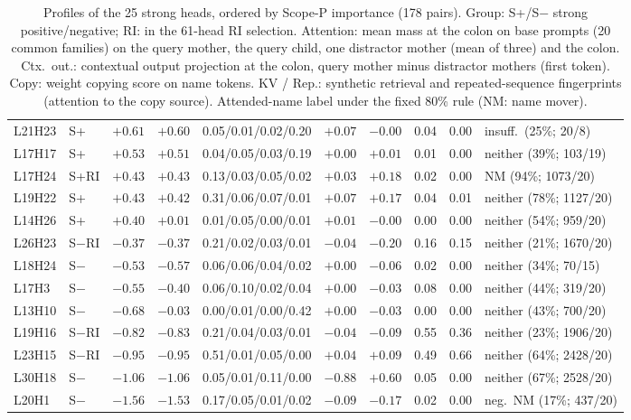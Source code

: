 \begin{table}[t]
\begin{tabular}{@{}llrrlrrrrl@{}}
L21H23 & S+ & $+0.61$ & $+0.60$ & 0.05/0.01/0.02/0.20 & $+0.07$ & $-0.00$ & 0.04 & 0.00 & insuff.\ (25\%; 20/8) \\
L17H17 & S+ & $+0.53$ & $+0.51$ & 0.04/0.05/0.03/0.19 & $+0.00$ & $+0.01$ & 0.01 & 0.00 & neither (39\%; 103/19) \\
L17H24 & S+RI & $+0.43$ & $+0.43$ & 0.13/0.03/0.05/0.02 & $+0.03$ & $+0.18$ & 0.02 & 0.00 & NM (94\%; 1073/20) \\
L19H22 & S+ & $+0.43$ & $+0.42$ & 0.31/0.06/0.07/0.01 & $+0.07$ & $+0.17$ & 0.04 & 0.01 & neither (78\%; 1127/20) \\
L14H26 & S+ & $+0.40$ & $+0.01$ & 0.01/0.05/0.00/0.01 & $+0.01$ & $-0.00$ & 0.00 & 0.00 & neither (54\%; 959/20) \\
L26H23 & S$-$RI & $-0.37$ & $-0.37$ & 0.21/0.02/0.03/0.01 & $-0.04$ & $-0.20$ & 0.16 & 0.15 & neither (21\%; 1670/20) \\
L18H24 & S$-$ & $-0.53$ & $-0.57$ & 0.06/0.06/0.04/0.02 & $+0.00$ & $-0.06$ & 0.02 & 0.00 & neither (34\%; 70/15) \\
L17H3 & S$-$ & $-0.55$ & $-0.40$ & 0.06/0.10/0.02/0.04 & $+0.00$ & $-0.03$ & 0.08 & 0.00 & neither (44\%; 319/20) \\
L13H10 & S$-$ & $-0.68$ & $-0.03$ & 0.00/0.01/0.00/0.42 & $+0.00$ & $-0.03$ & 0.00 & 0.00 & neither (43\%; 700/20) \\
L19H16 & S$-$RI & $-0.82$ & $-0.83$ & 0.21/0.04/0.03/0.01 & $-0.04$ & $-0.09$ & 0.55 & 0.36 & neither (23\%; 1906/20) \\
L23H15 & S$-$RI & $-0.95$ & $-0.95$ & 0.51/0.01/0.05/0.00 & $+0.04$ & $+0.09$ & 0.49 & 0.66 & neither (64\%; 2428/20) \\
L30H18 & S$-$ & $-1.06$ & $-1.06$ & 0.05/0.01/0.11/0.00 & $-0.88$ & $+0.60$ & 0.05 & 0.00 & neither (67\%; 2528/20) \\
L20H1 & S$-$ & $-1.56$ & $-1.53$ & 0.17/0.05/0.01/0.02 & $-0.09$ & $-0.17$ & 0.02 & 0.00 & neg.\ NM (17\%; 437/20) \\
\bottomrule
\end{tabular}
\caption{Profiles of the 25 strong heads, ordered by Scope-P importance (178 pairs).
Group: S+/S$-$ strong positive/negative; RI: in the 61-head RI selection. Attention:
mean mass at the colon on base prompts (20 common families) on the query mother, the
query child, one distractor mother (mean of three) and the colon. Ctx.\ out.:
contextual output projection at the colon, query mother minus distractor mothers
(first token). Copy: weight copying score on name tokens. KV / Rep.: synthetic
retrieval and repeated-sequence fingerprints (attention to the copy source).
Attended-name label under the fixed 80\% rule (NM: name mover).}
\label{tab:profiles-app}
\end{table}
